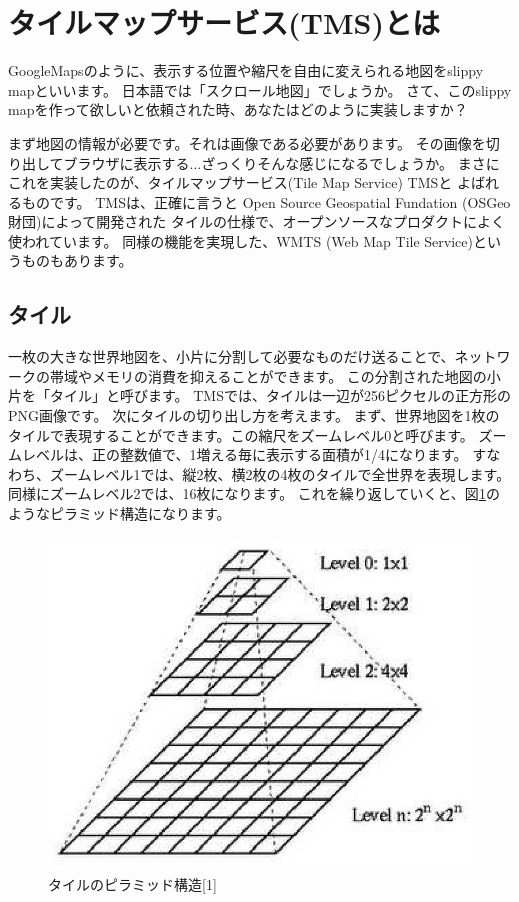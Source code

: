 \chapter*{タイルマップサービス(TMS)とは}

GoogleMapsのように、表示する位置や縮尺を自由に変えられる地図をslippy mapといいます。
日本語では「スクロール地図」でしょうか。
さて、このslippy mapを作って欲しいと依頼された時、あなたはどのように実装しますか？

まず地図の情報が必要です。それは画像である必要があります。
その画像を切り出してブラウザに表示する...ざっくりそんな感じになるでしょうか。
まさにこれを実装したのが、タイルマップサービス(Tile Map Service) TMSと
よばれるものです。
%
TMSは、正確に言うと Open Source Geospatial Fundation (OSGeo財団)によって開発された
タイルの仕様で、オープンソースなプロダクトによく使われています。
同様の機能を実現した、WMTS (Web Map Tile Service)というものもあります。

\section*{タイル}
一枚の大きな世界地図を、小片に分割して必要なものだけ送ることで、ネットワークの帯域やメモリの消費を抑えることができます。
この分割された地図の小片を「タイル」と呼びます。
TMSでは、タイルは一辺が256ピクセルの正方形のPNG画像です。
次にタイルの切り出し方を考えます。
まず、世界地図を1枚のタイルで表現することができます。この縮尺をズームレベル0と呼びます。
ズームレベルは、正の整数値で、1増える毎に表示する面積が1/4になります。
すなわち、ズームレベル1では、縦2枚、横2枚の4枚のタイルで全世界を表現します。
同様にズームレベル2では、16枚になります。
これを繰り返していくと、図\ref{fig:tile_pylamid}のようなピラミッド構造になります。

\begin{figure}[thbp]
\centering
\includegraphics{Tiling.eps}
\caption{タイルのピラミッド構造[1]}
\label{fig:tile_pylamid}
\end{figure}

